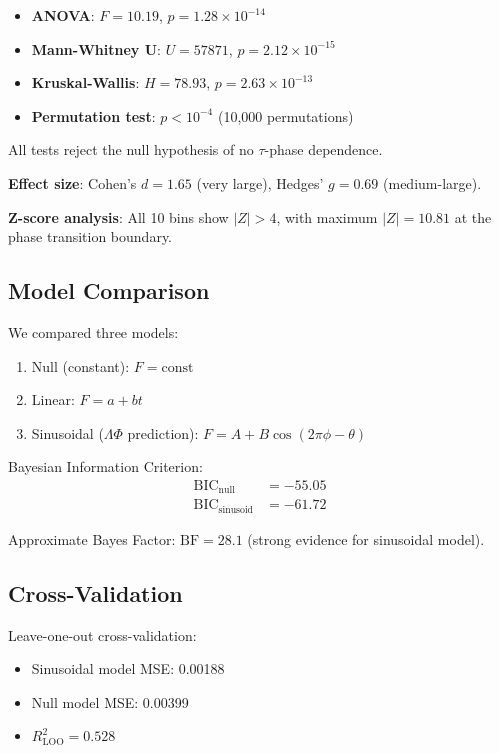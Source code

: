 \documentclass[11pt,twocolumn]{article}
\begin{document}
\begin{itemize}
\item \textbf{ANOVA}: $F = 10.19$, $p = 1.28 \times 10^{-14}$
\item \textbf{Mann-Whitney U}: $U = 57871$, $p = 2.12 \times 10^{-15}$
\item \textbf{Kruskal-Wallis}: $H = 78.93$, $p = 2.63 \times 10^{-13}$
\item \textbf{Permutation test}: $p < 10^{-4}$ (10,000 permutations)
\end{itemize}

All tests reject the null hypothesis of no $\tau$-phase dependence.

\textbf{Effect size}: Cohen's $d = 1.65$ (very large), Hedges' $g = 0.69$ (medium-large).

\textbf{Z-score analysis}: All 10 bins show $|Z| > 4$, with maximum $|Z| = 10.81$ at the phase transition boundary.

\subsection{Model Comparison}

We compared three models:
\begin{enumerate}
\item Null (constant): $F = \mathrm{const}$
\item Linear: $F = a + bt$
\item Sinusoidal ($\Lambda\Phi$ prediction): $F = A + B\cos(2\pi\phi - \theta)$
\end{enumerate}

Bayesian Information Criterion:
\begin{align}
\mathrm{BIC}_{\mathrm{null}} &= -55.05 \\
\mathrm{BIC}_{\mathrm{sinusoid}} &= -61.72
\end{align}

Approximate Bayes Factor: $\mathrm{BF} = 28.1$ (strong evidence for sinusoidal model).

\subsection{Cross-Validation}

Leave-one-out cross-validation:
\begin{itemize}
\item Sinusoidal model MSE: 0.00188
\item Null model MSE: 0.00399
\item $R^2_{\mathrm{LOO}} = 0.528$
\end{itemize}
\end{document}

